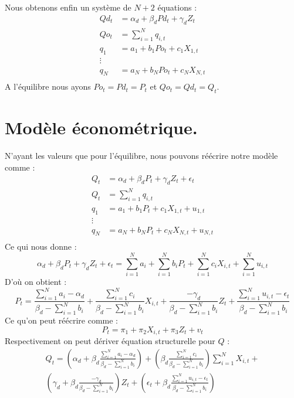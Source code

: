 \documentclass[11pt, a4paper]{article}
\begin{document}
Nous obtenons enfin un système de $N + 2$ équations : 
\begin{align*}
    Qd_t & = \alpha_d + \beta_d Pd_t + \gamma_d Z_t \\
    Qo_t & = \sum_{i = 1}^{N} q_{i,t} \\
    q_1 & = a_1 + b_1 Po_{t} + c_1 X_{1,t} \\ 
    \vdots \\ 
    q_N & = a_N + b_N Po_{t} + c_N X_{N,t} \\
\end{align*}
A l'équilibre nous ayons $Po_t = Pd_t = P_t$ et $Qo_t = Qd_t = Q_t$.

\section*{Modèle économétrique.}
N'ayant les valeurs que pour l'équilibre, nous pouvons réécrire notre modèle comme :
\begin{align*}
  Q_t & = \alpha_d + \beta_d P_t + \gamma_d Z_t + \epsilon_t \\
  Q_t & = \sum_{i = 1}^{N} q_{i,t} \\
  q_1 & = a_1 + b_1 P_{t} + c_1 X_{1,t} + u_{1,t}\\ 
  \vdots \\ 
  q_N & = a_N + b_N P_{t} + c_N X_{N,t} + u_{N,t}\\
\end{align*}
Ce qui nous donne : 
\begin{equation}
    \alpha_d + \beta_d P_t + \gamma_d Z_t + \epsilon_t = 
        \sum_{i = 1}^{N} a_i + \sum_{i = 1}^{N} b_i P_t + \sum_{i = 1}^{N} c_i X_{i,t} + \sum_{i = 1}^{N} u_{i,t}
\end{equation}
D'où on obtient :
\begin{equation}
    P_t = \frac{\sum_{i = 1}^{N} a_i - \alpha_d}{\beta_d - \sum_{i = 1}^{N} b_i} + 
        \frac{\sum_{i = 1}^{N} c_i}{\beta_d - \sum_{i = 1}^{N} b_i} X_{i,t} +
        \frac{-\gamma_d}{\beta_d - \sum_{i = 1}^{N} b_i} Z_t + 
        \frac{\sum_{i = 1}^{N} u_{i,t} - \epsilon_t}{\beta_d - \sum_{i = 1}^{N} b_i}
\end{equation}
Ce qu'on peut réécrire comme :
\begin{equation}
  P_t = \pi_1 + 
      \pi_2 X_{i,t} +
      \pi_3 Z_t + 
      v_t
\end{equation}
Respectivement on peut dériver équation structurelle pour $Q$ :
\begin{multline}
    Q_t = (\alpha_d + \beta_d \frac{\sum_{i = 1}^{N} a_i - \alpha_d}{\beta_d - \sum_{i = 1}^{N} b_i}) + 
        (\beta_d \frac{\sum_{i = 1}^{N} c_i}{\beta_d - \sum_{i = 1}^{N} b_i}) \sum_{i = 1}^{N} X_{i,t} + \\
        (\gamma_d + \beta_d \frac{-\gamma_d}{\beta_d - \sum_{i = 1}^{N} b_i}) Z_t + 
        (\epsilon_t + \beta_d \frac{\sum_{i = 1}^{N} u_{i,t} - \epsilon_t}{\beta_d - \sum_{i = 1}^{N} b_i})
\end{multline}
\end{document}
